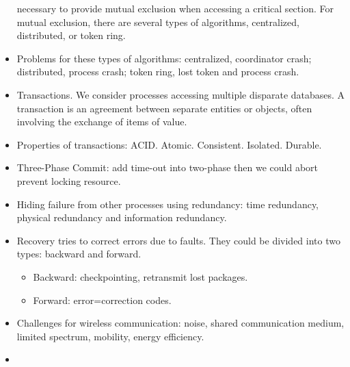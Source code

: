 \documentclass[twocolumn]{article}
\begin{document}
\begin{itemize}
  necessary to provide mutual exclusion when accessing a critical
  section. For mutual exclusion, there are several types of algorithms,
  centralized, distributed, or token ring.
\item Problems for these types of algorithms: centralized, coordinator
  crash; distributed, process crash; token ring, lost token and
  process crash.
\item Transactions. We consider processes accessing multiple disparate
  databases. A transaction is an agreement between separate entities
  or objects, often involving the exchange of items of value.
\item Properties of transactions:
  ACID\@. Atomic. Consistent. Isolated. Durable. 
\item Three-Phase Commit: add time-out into two-phase then we could
  abort prevent locking resource.
\item Hiding failure from other processes using redundancy: time
  redundancy, physical redundancy and information redundancy.
\item Recovery tries to correct errors due to faults. They could be
  divided into two types: backward and forward.
  \begin{itemize}
  \item Backward: checkpointing, retransmit lost packages.
  \item Forward: error=correction codes.
  \end{itemize}
\item Challenges for wireless communication: noise, shared
  communication medium, limited spectrum, mobility, energy
  efficiency.
\item  

\end{itemize}
\end{document}
